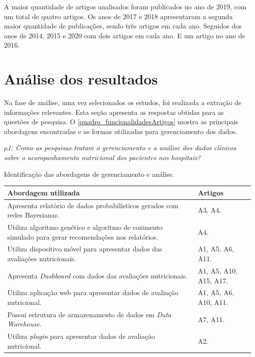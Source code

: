 A maior quantidade de artigos analisados foram publicados no ano de 2019, com um total de quatro artigos. Os anos de 2017 e 2018 apresentaram a segunda maior quantidade de publicações, sendo três artigos em cada ano. Seguidos dos anos de 2014, 2015 e 2020 com dois artigos em cada ano. E um artigo no ano de 2016.

\section{Análise dos resultados}
Na fase de análise, uma vez selecionados os estudos, foi realizada a extração de informações relevantes. Esta seção apresenta as respostas obtidas para as questões de pesquisa. O \autoref{quadro_funcionalidadesArtigos} mostra as principais abordagens encontradas e as formas utilizadas para gerenciamento dos dados.

\textit{µ1: Como as pesquisas tratam o gerenciamento e a análise dos dados clínicos sobre o acompanhamento nutricional dos pacientes nos hospitais?}

\begin{quadro}[htb]
\caption{\label{quadro_funcionalidadesArtigos}Identificação das abordagens de gerenciamento e análise.}
\label{}
\begin{tabular}{|p{11cm}|p{4cm}|}
	\hline
	\textbf{Abordagem utilizada}   &   \textbf{Artigos}\\ \hline
	Apresenta relatório de dados probabilísticos gerados com redes Bayesianas.   &   A3, A4.\\ \hline
	Utiliza algoritmo genético e algoritmo de cozimento simulado para gerar recomendações nos relatórios.  &   A4.\\ \hline
	Utiliza dispositivo móvel para apresentar dados das avaliações nutricionais. & A1, A5, A6, A11.\\ \hline
	Apresenta \textit{Dashboard} com dados das avaliações nutricionais. & A1, A5, A10, A15, A17.\\ \hline
    Utiliza aplicação web para apresentar dados de avaliação nutricional. & A1, A5, A6, A10, A11.\\ \hline
	Possui estrutura de armazenamento de dados em\textit{ Data Warehouse}. & A7, A11.\\ \hline
	Utiliza \textit{plugin} para apresentar dados de avaliação nutricional.  & A2.\\ \hline
\end{tabular}
\end{quadro}

